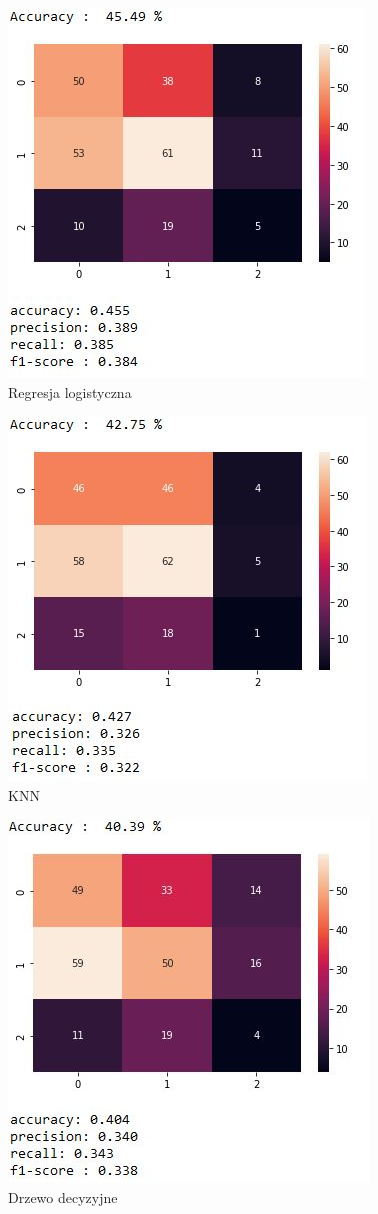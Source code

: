 \documentclass{article}
\begin{document}
	\begin{figure}[ht!]
		\centering
		\includegraphics[width=.55\textwidth]{ss/6.JPG}
		\caption{Regresja logistyczna}
		\label{tab:regr}
	\end{figure}
	
	\begin{figure}[ht!]
		\centering
		\includegraphics[width=.55\textwidth]{ss/7.JPG}
		\caption{KNN}
		\label{tab:knn}
	\end{figure}
	
	\hspace{5cm}
	
	\begin{figure}[ht!]
		\centering
		\includegraphics[width=.55\textwidth]{ss/8.JPG}
		\caption{Drzewo decyzyjne}
		\label{tab:tree}
	\end{figure}
	
\end{document}
